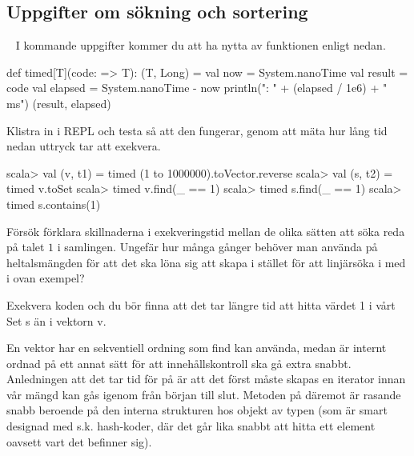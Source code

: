 \else

\ExerciseSolution{\ExeWeekTWELVE}

\subsection{Uppgifter om sökning och sortering}

\fi





\QUESTBEGIN

\Task \label{task:timed} \what~  I kommande uppgifter kommer du att ha nytta av funktionen  enligt nedan.
\begin{Code}
def timed[T](code: => T): (T, Long) = 
  val now = System.nanoTime
  val result = code
  val elapsed = System.nanoTime - now
  println("\ntime: " + (elapsed / 1e6) + " ms")
  (result, elapsed)
\end{Code}
\Subtask Klistra in  i REPL och testa så att den fungerar, genom att mäta hur lång tid nedan uttryck tar att exekvera.
\begin{REPL}
scala> val (v, t1) = timed{ (1 to 1000000).toVector.reverse }
scala> val (s, t2) = timed{ v.toSet }
scala> timed{ v.find(_ == 1) }
scala> timed{ s.find(_ == 1) }
scala> timed{ s.contains(1) }
\end{REPL}
\Subtask\Pen Försök förklara skillnaderna i exekveringstid mellan de olika sätten att söka reda på  talet $1$ i samlingen. Ungefär hur många gånger behöver man använda  på heltalsmängden  för att det ska löna sig att skapa  i stället för att linjärsöka i  med  i ovan exempel?


\SOLUTION


\TaskSolved \what


\SubtaskSolved
Exekvera koden och du bör finna att det tar längre tid att hitta värdet 1 i vårt Set s än i vektorn v.

\SubtaskSolved

En vektor har en sekventiell ordning som find kan använda, medan  är internt ordnad  på ett annat sätt för att innehållskontroll ska gå extra snabbt. Anledningen att det tar tid för  på  är att det först måste skapas en iterator innan vår mängd kan gås igenom från början till slut. Metoden  på  däremot är rasande snabb beroende på den interna strukturen hos objekt av typen  (som är smart designad med s.k. hash-koder, där det går lika snabbt att hitta ett element oavsett vart det befinner sig).



